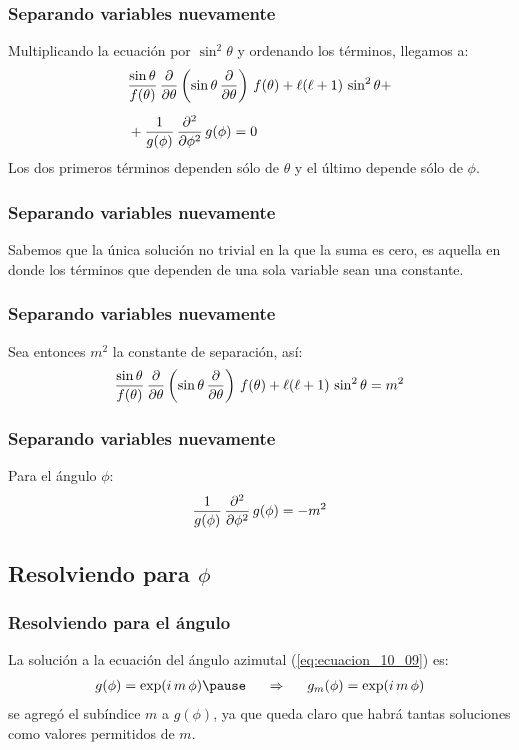 \documentclass[12pt]{beamer}
\begin{document}
\begin{frame}
\frametitle{Separando variables nuevamente}
Multiplicando la ecuación por $\sin^{2} \theta$ y ordenando los términos, llegamos a:
\pause
\begin{align*}
&\dfrac{\sin \theta}{f (\theta)} \, \pdv{\theta} \left( \sin \theta \, \pdv{\theta} \right) \, f (\theta) + \ell (\ell + 1) \, \sin^{2} \theta + \\[0.5em]
&+\dfrac{1}{g(\phi)} \, \pdv[2]{\phi} \, g(\phi) = 0
\end{align*}
\pause
Los dos primeros términos dependen sólo de $\theta$ y el último depende sólo de $\phi$. 
\end{frame}
\begin{frame}
\frametitle{Separando variables nuevamente}
Sabemos que la única solución no trivial en la que la suma es cero, \pause es aquella en donde los términos que dependen de una sola variable sean una constante.
\end{frame}
\begin{frame}
\frametitle{Separando variables nuevamente}
Sea entonces $m^{2}$ la constante de separación, así:
\pause
\begin{align}
\dfrac{\sin \theta}{f (\theta)} \, \pdv{\theta} \left( \sin \theta \, \pdv{\theta} \right) \, f (\theta) + \ell (\ell + 1) \, \sin^{2} \theta = m^{2}
\label{eq:ecuacion_10_08}
\end{align}
\end{frame}
\begin{frame}
\frametitle{Separando variables nuevamente}
Para el ángulo $\phi$:
\pause
\begin{align}
\dfrac{1}{g(\phi)} \, \pdv[2]{\phi} \, g(\phi) = -m^{2}
\label{eq:ecuacion_10_09}
\end{align}
\end{frame}

\subsection{Resolviendo para \texorpdfstring{$\phi$}{p}}

\begin{frame}
\frametitle{Resolviendo para el ángulo}
La solución a la ecuación del ángulo azimutal (\ref{eq:ecuacion_10_09}) es:
\pause
\begin{eqnarray}
g(\phi) = \exp(i \, m \, \phi) \pause \hspace{0.5cm} \Rightarrow \hspace{0.5cm} g_{m} (\phi) = \exp(i \, m \, \phi)
\label{eq:ecuacion_10_10}
\end{eqnarray}
\pause 
se agregó el subíndice $m$ a $g(\phi)$, ya que queda claro que habrá tantas soluciones como valores permitidos de $m$.
\end{frame}
\end{document}
